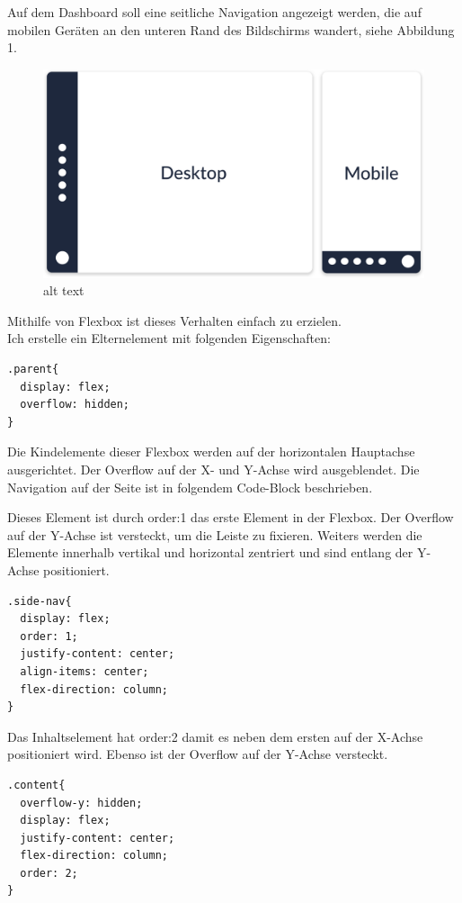 Auf dem Dashboard soll eine seitliche Navigation angezeigt werden, die
auf mobilen Geräten an den unteren Rand des Bildschirms wandert, siehe
Abbildung 1.

\begin{figure}
\centering
\includegraphics{../../Design/Flexbox_Illustration_1.png}
\caption{alt text}
\end{figure}

Mithilfe von Flexbox ist dieses Verhalten einfach zu erzielen.\\
Ich erstelle ein Elternelement mit folgenden Eigenschaften:

\begin{verbatim}
.parent{
  display: flex;
  overflow: hidden;
}
\end{verbatim}

Die Kindelemente dieser Flexbox werden auf der horizontalen Hauptachse
ausgerichtet. Der Overflow auf der X- und Y-Achse wird ausgeblendet. Die
Navigation auf der Seite ist in folgendem Code-Block beschrieben.

Dieses Element ist durch order:1 das erste Element in der Flexbox. Der
Overflow auf der Y-Achse ist versteckt, um die Leiste zu fixieren.
Weiters werden die Elemente innerhalb vertikal und horizontal zentriert
und sind entlang der Y-Achse positioniert.

\begin{verbatim}
.side-nav{
  display: flex;
  order: 1;
  justify-content: center;
  align-items: center;
  flex-direction: column;
}
\end{verbatim}

Das Inhaltselement hat order:2 damit es neben dem ersten auf der X-Achse
positioniert wird. Ebenso ist der Overflow auf der Y-Achse versteckt.

\begin{verbatim}
.content{
  overflow-y: hidden;
  display: flex;
  justify-content: center;
  flex-direction: column;
  order: 2;
}
\end{verbatim}

